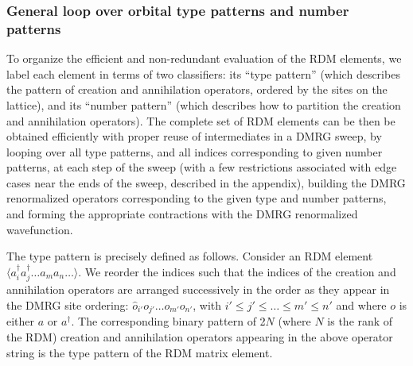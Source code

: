 \subsubsection{General loop over orbital type patterns and number patterns}

To organize the efficient and non-redundant evaluation of the RDM elements, we label each element in terms of two classifiers: its ``type pattern'' (which describes
the pattern of creation and annihilation operators, ordered by the sites on the lattice), and its ``number pattern'' (which describes how to partition the creation and annihilation operators). 
The complete set of RDM elements can be then be obtained efficiently with
proper reuse of intermediates in a DMRG sweep, by looping over all 
type patterns, and all indices corresponding to given number patterns, at each step of the sweep (with a few restrictions associated with edge cases near the ends of the sweep, described in the appendix), building the DMRG renormalized operators corresponding to the given type and number patterns, and forming
the appropriate contractions with the DMRG renormalized wavefunction. 

The type pattern is precisely defined as follows. Consider an RDM element $\langle {a}^\dagger_i{a}^\dagger_j\dots {a}_m{a}_n\dots \rangle$. 
We reorder the indices such that the indices of the creation and annihilation operators are arranged successively in the order as they appear
in the DMRG site ordering: $\hat{o}_{i'}o_{j'}\dots o_{m'}o_{n'}$, with $i'\le j'\le \dots \le m' \le n'$ and where $o$ is either $a$ or $a^\dagger$.
The corresponding binary pattern of 2$N$ (where $N$ is the rank of the RDM) creation and annihilation operators appearing in the above operator string 
is the type pattern of the RDM matrix element.


